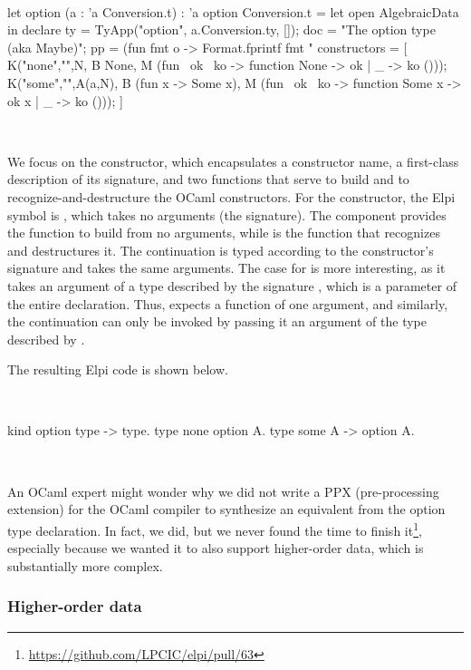 \documentclass[a4paper, 11pt]{book}
\newenvironment{elpicode}
  {\VerbatimEnvironment~\\\begin{elpibox}\begin{xelpicode}}{\end{xelpicode}
\end{elpibox}\\}
\newenvironment{ocamlcode}
  {\VerbatimEnvironment~\\\begin{ocamlbox}\begin{xocamlcode}}{\end{xocamlcode}
\end{ocamlbox}\\}
\begin{document}
\begin{ocamlcode}
let option (a : 'a Conversion.t) : 'a option Conversion.t =
  let open AlgebraicData in
  declare {
    ty = TyApp("option", a.Conversion.ty, []); %
    doc = "The option type (aka Maybe)";
    pp = (fun fmt o ->
      Format.fprintf fmt "%
    constructors = [
      K("none","",N,
        B None,
        M (fun ~ok ~ko -> function None -> ok | _ -> ko ())); 
      K("some","",A(a,N),
        B (fun x -> Some x),
        M (fun ~ok ~ko -> function Some x -> ok x | _ -> ko ())); 
    ]
  }
\end{ocamlcode}

\noindent
We focus on the  constructor, which encapsulates a constructor name,
a first-class description of its signature, and two functions that serve to
build and to recognize-and-destructure the OCaml constructors. For the
 constructor, the Elpi symbol is , which takes no
arguments (the  signature). The  component provides the
function to build  from no arguments, while  is the
function that recognizes and destructures it. The  continuation is
typed according to the constructor's signature and takes the same arguments.
The case for  is more interesting, as it takes an argument of a
type described by the signature , which is a parameter of the entire
declaration. Thus,  expects a function of one argument, and
similarly, the continuation  can only be invoked by passing it an
argument of the type described by .

The resulting Elpi code is shown below.

\begin{elpicode}
kind option type -> type.
type none option A.
type some A -> option A.
\end{elpicode}

An OCaml expert might wonder why we did not write a PPX (pre-processing
extension) for the OCaml compiler to synthesize an equivalent
 from the option type declaration. In fact, we did, but we
never found the time to finish it\footnote{\url{https://github.com/LPCIC/elpi/pull/63}},
especially because we wanted it to also support higher-order data, which is
substantially more complex.


\subsubsection{Higher-order data}\label{sec:hodata}
\end{document}
